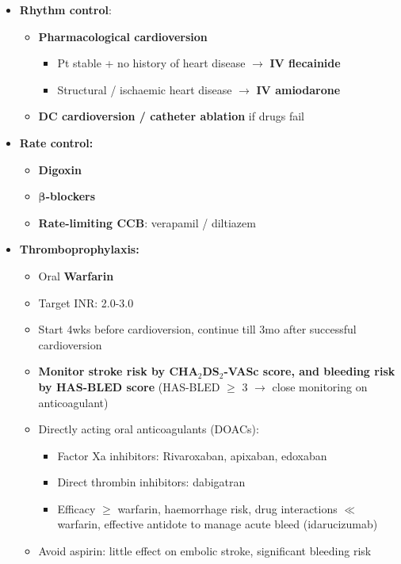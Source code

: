 \documentclass[
  12pt,
]{memoir}
\providecommand{\tightlist}{%
  \setlength{\itemsep}{0pt}\setlength{\parskip}{0pt}}
\begin{document}
\begin{itemize}
\tightlist
\item
  \textbf{Rhythm control}:

  \begin{itemize}
  \tightlist
  \item
    \textbf{Pharmacological cardioversion}

    \begin{itemize}
    \tightlist
    \item
      Pt stable + no history of heart disease \(\rightarrow\) \textbf{IV
      flecainide}
    \item
      Structural / ischaemic heart disease \(\rightarrow\) \textbf{IV
      amiodarone}
    \end{itemize}
  \item
    \textbf{DC cardioversion / catheter ablation} if drugs fail
  \end{itemize}
\item
  \textbf{Rate control:}

  \begin{itemize}
  \tightlist
  \item
    \textbf{Digoxin}
  \item
    \textbf{\(\boldsymbol\beta\)-blockers}
  \item
    \textbf{Rate-limiting CCB}: verapamil / diltiazem
  \end{itemize}
\item
  \textbf{Thromboprophylaxis:} \label{item:anticoag}

  \begin{itemize}
  \tightlist
  \item
    Oral \textbf{Warfarin}
  \item
    Target INR: 2.0-3.0
  \item
    Start 4wks before cardioversion, continue till 3mo after successful
    cardioversion
  \item
    \textbf{Monitor stroke risk by CHA\(_2\)DS\(_2\)-VASc score, and
    bleeding risk by HAS-BLED score} (HAS-BLED \(\ge\) 3 \(\rightarrow\)
    close monitoring on anticoagulant)
  \item
    Directly acting oral anticoagulants (DOACs):

    \begin{itemize}
    \tightlist
    \item
      Factor Xa inhibitors: Rivaroxaban, apixaban, edoxaban
    \item
      Direct thrombin inhibitors: dabigatran
    \item
      Efficacy \(\ge\) warfarin, haemorrhage risk, drug interactions
      \(\ll\) warfarin, effective antidote to manage acute bleed
      (idarucizumab)
    \end{itemize}
  \item
    Avoid aspirin: little effect on embolic stroke, significant bleeding
    risk
  \end{itemize}
\end{itemize}
\end{document}
